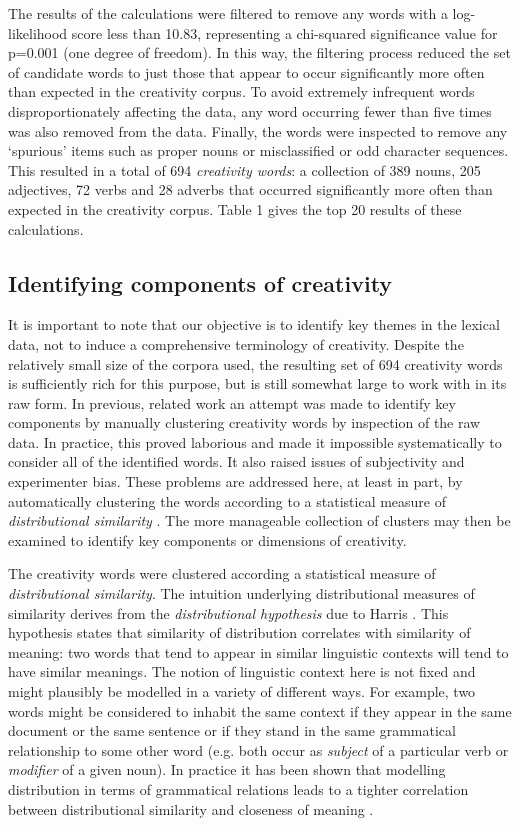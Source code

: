 \documentclass[10pt,letterpaper]{article}
\begin{document}
The results of the calculations were filtered to remove any words with a log-likelihood score less than 10.83, representing a chi-squared significance value for p=0.001 (one degree of freedom). In this way, the filtering process reduced the set of candidate words to just those that appear to occur significantly more often than expected in the creativity corpus. To avoid extremely infrequent words disproportionately affecting the data, any word occurring fewer than five times was also removed from the data. Finally, the words were inspected to remove any `spurious' items such as proper nouns or misclassified or odd character sequences. This resulted in a total of 694 {\em creativity words\/}: a collection of 389 nouns, 205 adjectives, 72 verbs and 28 adverbs that occurred significantly more often than expected in the creativity corpus. Table 1 %
gives the top 20 results of these calculations.



\subsection*{Identifying components of creativity}
\label{creat-comps}

It is important to note that our objective is to identify key themes in the lexical data, not to induce a comprehensive terminology of creativity. Despite the relatively small size of the corpora used, the resulting set of 694 creativity words is sufficiently rich for this purpose, but is still somewhat large to work with in its raw form. In previous, related work \cite{jordanous10a} an attempt was made to identify key components by manually clustering creativity words by inspection of the raw data. In practice, this proved laborious and made it impossible systematically to consider all of the identified words. It also raised issues of subjectivity and experimenter bias. These problems are addressed here, at least in part, by automatically clustering the words according to a statistical measure of {\em distributional similarity\/} \cite{lin98}.  The more manageable collection of clusters may then be examined to identify key components or dimensions of creativity.

The creativity words were clustered according a statistical measure of {\em distributional similarity\/}. The intuition underlying distributional measures of similarity derives from the {\em distributional hypothesis\/} due to Harris \cite{harris68}. This hypothesis  states that similarity of distribution correlates with similarity of meaning: two words that tend to appear in similar linguistic contexts will tend to have similar meanings. The notion of linguistic context here is not fixed and might plausibly be modelled in a variety of different ways. For example, two words might be considered to inhabit the same context if they appear in the same document or the same sentence or if they stand in the same grammatical relationship to some other word (e.g. both occur as {\em subject\/} of a particular verb or {\em modifier\/} of a given noun). In practice it has been shown that modelling distribution in terms of grammatical relations leads to a tighter correlation between distributional similarity and closeness of meaning \cite{kilgarriff00}. 
\end{document}
